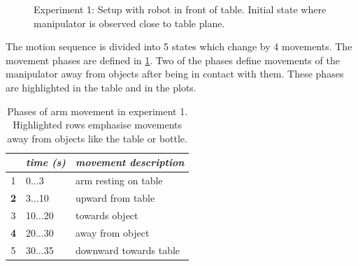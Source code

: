 \begin{figure}[h]
\centering
{}
\hspace{1cm}
\caption[Experiment 1: Setup]{Experiment 1: Setup with robot in front of table. Initial state where manipulator is observed close to table plane.}
\label{fig:exp1_setup}
\end{figure}

The motion sequence is divided into 5 states which change by 4 movements. The movement phases are defined in \cref{tab:prior_movement_phases}. Two of the phases define movements of the manipulator away from objects after being in contact with them. These phases are highlighted in the table and in the plots.

\begin{table}[h]
\centering
\begin{tabular}{|c|l|l|}
\hline
 & \emph{time (s)} & \emph{movement description} \\
\hline
1 & 0$\dots$3 & arm resting on table \\
\hline
\rowcolor{gray!30} \textbf{2} & 3$\dots$10 & upward from table \\
\hline
3 & 10$\dots$20 & towards object \\
\hline
\rowcolor{gray!30} \textbf{4} & 20$\dots$30 & away from object \\
\hline
5 & 30$\dots$35 & downward towards table \\
\hline
\end{tabular}
\caption{Phases of arm movement in experiment 1. Highlighted rows emphasise movements away from objects like the table or bottle.}
\label{tab:prior_movement_phases}
\end{table}

